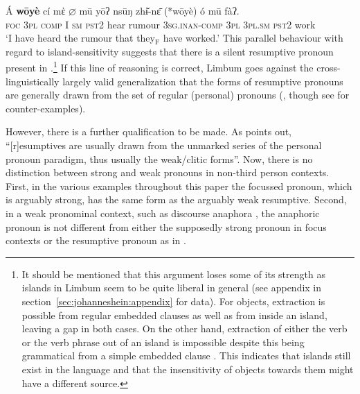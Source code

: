 \documentclass[output=paper]{langscibook}
\begin{document}
\ea \label{ex:johanneshein:islandextraction-plural}
\gll Á \textbf{wōyè} cí mὲ $\varnothing$ mū yōʔ nsūŋ zhɨ̌-nɛ̄ (*wōyè) ó mū fàʔ.\\
\textsc{foc} \textsc{3pl} \textsc{comp} I \textsc{sm} \textsc{pst2} hear rumour \textsc{3sg.inan-comp} \hphantom{(*}\textsc{3pl} \textsc{3pl.sm} \textsc{pst2} work\\
\glt `I have heard the rumour that they$_{\text{F}}$ have worked.'
\z
This parallel behaviour with regard to island-sensitivity suggests
that there is a silent resumptive pronoun present in
.\footnote{It should be mentioned that this argument loses some
  of its strength as islands in Limbum seem to be quite liberal in
  general (see appendix in section~\ref{sec:johanneshein:appendix} for data). For objects, extraction is possible from regular embedded clauses as well as from inside an island, leaving a gap in both cases. On the other hand, extraction of either the verb
or the verb phrase out of an island is
impossible despite this being grammatical from a simple embedded clause \citep[for details, see][]{hein20:book}. This
indicates that islands still exist in the language and that the
insensitivity of objects towards them might have a different source.
}
If this line of reasoning is correct, Limbum goes against the
cross-linguistically largely valid generalization that the forms of
resumptive pronouns are generally drawn from the set of regular
(personal) pronouns
(\citealp{asudeh11,asudeh12,salzmann17:book,mcCloskey17}, though see
\citealp{adger11} for counter-examples).

However, there is a further qualification to be made. As
\citet[][187]{salzmann17:book} points out, ``[r]esumptives are usually
drawn from the unmarked series of the personal pronoun paradigm, thus
usually the weak/clitic forms''. Now, there is no distinction between
strong and weak pronouns in non-third person contexts. First, in the
various examples throughout this paper the focussed pronoun, which is
arguably strong, has the same form as the arguably weak
resumptive. Second, in a weak pronominal context, such as discourse
anaphora , the anaphoric pronoun is not different from either the
supposedly strong pronoun in focus contexts or the resumptive pronoun as in .
\end{document}
